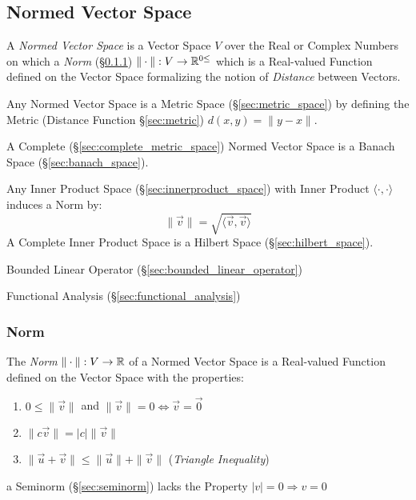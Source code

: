 \subsection{Normed Vector Space}\label{sec:normed_vectorspace}

A \emph{Normed Vector Space} is a Vector Space $V$ over the Real or Complex
Numbers on which a \emph{Norm} (\S\ref{sec:norm}) $\|\cdot\| : V \rightarrow
\mathbb{R}^{0\leq}$ which is a Real-valued Function defined on the Vector Space
formalizing the notion of \emph{Distance} between Vectors.

Any Normed Vector Space is a Metric Space (\S\ref{sec:metric_space}) by
defining the Metric (Distance Function \S\ref{sec:metric}) $d(x,y) = \|y-x\|$.

A Complete (\S\ref{sec:complete_metric_space}) Normed Vector Space is a Banach
Space (\S\ref{sec:banach_space}).

Any Inner Product Space (\S\ref{sec:innerproduct_space}) with Inner Product
$\langle{\cdot,\cdot}\rangle$ induces a Norm by:
\[
  \|\vec{v}\| = \sqrt{\langle{\vec{v},\vec{v}}\rangle}
\]
A Complete Inner Product Space is a Hilbert Space (\S\ref{sec:hilbert_space}).

Bounded Linear Operator (\S\ref{sec:bounded_linear_operator})

Functional Analysis (\S\ref{sec:functional_analysis})



\subsubsection{Norm}\label{sec:norm}

The \emph{Norm} $\|\cdot\| : V \rightarrow \mathbb{R}$ of a Normed Vector Space is
a Real-valued Function defined on the Vector Space with the properties:
\begin{enumerate}
  \item $0 \leq \|\vec{v}\|$ and
    $\|\vec{v}\| = 0 \Leftrightarrow \vec{v} = \vec{0}$
  \item $\|c\vec{v}\| = |c|\|\vec{v}\|$
  \item $\|\vec{u} + \vec{v}\| \leq \|\vec{u}\| + \|\vec{v}\|$ (\emph{Triangle
    Inequality})
\end{enumerate}

a Seminorm (\S\ref{sec:seminorm}) lacks the Property $|v| = 0 \Longrightarrow v
= 0$

